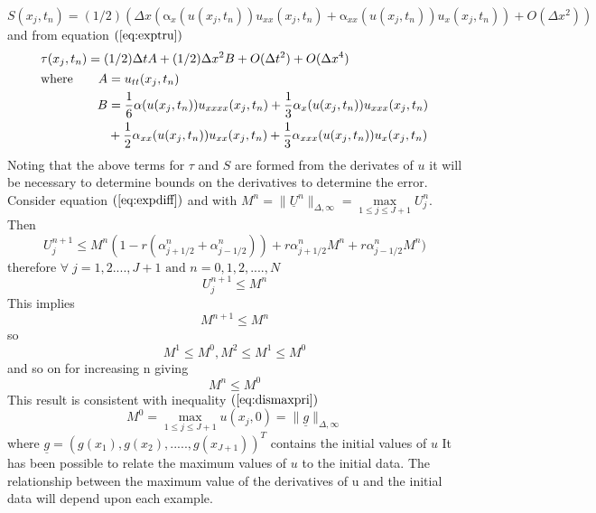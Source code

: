 \documentclass[11pt]{article}
\newcommand{\D}{\Delta}
\newcommand{\al}{\mathrm{\alpha}}
\begin{document}
\begin{equation} 
\label{eq:residual4}
 S(x_j,t_n) = (1/2)\left(\D{x}\left(  \al_x(u(x_j,t_n))u_{xx}(x_j,t_n) +  \al_{xx}(u(x_j,t_n))u_{x}(x_j,t_n)              \right )    + O(\D{x^2}  )\right) 
\end{equation} 
and from equation $(\ref{eq:exptru})$
\begin{equation*}
\begin{split}
&\tau(x_j,t_n) = (1/2)\D{t}A + (1/2)\D{x^2}B + O(\D{t^2}) + O(\D{x^4})\\ 
&\begin{aligned}
\text{where\qquad}
A &= u_{tt}(x_j,t_n)\\
B &= \frac{ 1 }{6 }\al(u(x_j,t_n))u_{xxxx}(x_j,t_n)+ \frac{1}{3} \al_x(u(x_j,t_n ))u_{xxx}(x_j,t_n ) \\ &+\frac{1}{2}\al_{xx}(u(x_j,t_n))u_{xx}(x_j,t_n) +\frac{1}{3}\al_{xxx}(u(x_j,t_n))u_{x}(x_j,t_n)
\end{aligned}
\end{split}
\end{equation*}
Noting that the above terms for $\tau$ and $S$ are formed from the derivates of $u$ it will be necessary to determine bounds on the derivatives to determine the error.
Consider equation $(\ref{eq:expdiff})$ and with $M^n = \|{\underline{U}^n}\|_{\D,\infty} = \max\limits_{1\leq{j}\leq{J+1}   }{U_j^n}  $.
Then 
$$U_j^{n+1} \leq M^n(1 -r  (\alpha_{j+1/2}^n+\alpha_{j-1/2}^n)) + r\alpha_{j+1/2}^nM^n +r\alpha_{j-1/2}^nM^n)$$
therefore $\forall\;j= 1, 2....,J+1 \text{ and }n = 0, 1, 2,....,N$
\begin{equation}
\label{eq:maxpri2}
U_j^{n+1} \leq M^n
\end{equation}
This implies
\begin{equation}
\label{eq:maxpri20}
M^{n+1} \leq  M^n
\end{equation}
so
$$ M^1 \leq M^0, M^2 \leq M^1 \leq M^0$$
and so on for increasing n giving
\begin{equation}
\label{eq:maxpri21}
M^n \leq M^0
\end{equation}
This result is consistent with inequality $(\ref{eq:dismaxpri})$ 
$$ M^0 = \max\limits_{1\leq{j}\leq{J+1}}u(x_j,0)  = \|\underline{g}\|_{\D,\infty}$$
where $\underline{g} = (g(x_1), g(x_2),.....,g(x_{J+1}))^T$ contains the initial values of $u$
It has been possible to relate the maximum values of $u$ to the initial data. The relationship between the maximum value of the derivatives of u and the initial data will depend upon each example. \\
\end{document}
